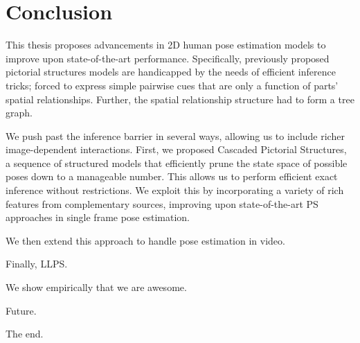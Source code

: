 \chapter{Conclusion}

This thesis proposes advancements in 2D human pose estimation models to improve 
upon state-of-the-art performance.  Specifically, previously proposed pictorial 
structures models are handicapped by the needs of efficient inference tricks; 
forced to express simple pairwise cues that are only a function of parts' 
spatial relationships.  Further, the spatial relationship structure had to form 
a tree graph.

We push past the inference barrier in several ways, allowing us to include 
richer image-dependent interactions.  First, we proposed Cascaded Pictorial 
Structures, a sequence of structured models that efficiently prune the state 
space of possible poses down to a manageable number.  This allows us to perform 
efficient exact inference without restrictions.  We exploit this by 
incorporating a variety of rich features from complementary sources, improving 
upon state-of-the-art PS approaches in single frame pose estimation.

We then extend this approach to handle pose estimation in video.

Finally, LLPS.

We show empirically that we are awesome.

Future.

The end.










